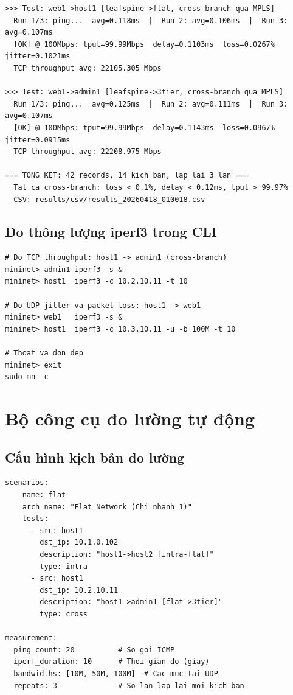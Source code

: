 \begin{lstlisting}[style=termstyle, caption={Ping cross-branch: web1 (Leaf-Spine) $\to$ host1 (Flat) và admin1 (3-Tier)}]
>>> Test: web1->host1 [leafspine->flat, cross-branch qua MPLS]
  Run 1/3: ping...  avg=0.118ms  |  Run 2: avg=0.106ms  |  Run 3: avg=0.107ms
  [OK] @ 100Mbps: tput=99.99Mbps  delay=0.1103ms  loss=0.0267% jitter=0.1021ms
  TCP throughput avg: 22105.305 Mbps

>>> Test: web1->admin1 [leafspine->3tier, cross-branch qua MPLS]
  Run 1/3: ping...  avg=0.125ms  |  Run 2: avg=0.111ms  |  Run 3: avg=0.107ms
  [OK] @ 100Mbps: tput=99.99Mbps  delay=0.1143ms  loss=0.0967% jitter=0.0915ms
  TCP throughput avg: 22208.975 Mbps

=== TONG KET: 42 records, 14 kich ban, lap lai 3 lan ===
  Tat ca cross-branch: loss < 0.1%, delay < 0.12ms, tput > 99.97%
  CSV: results/csv/results_20260418_010018.csv
\end{lstlisting}

\subsection{Đo thông lượng iperf3 trong CLI}

\begin{lstlisting}[style=bashstyle, caption={Đo thông lượng TCP và UDP bằng iperf3}]
# Do TCP throughput: host1 -> admin1 (cross-branch)
mininet> admin1 iperf3 -s &
mininet> host1  iperf3 -c 10.2.10.11 -t 10

# Do UDP jitter va packet loss: host1 -> web1
mininet> web1   iperf3 -s &
mininet> host1  iperf3 -c 10.3.10.11 -u -b 100M -t 10

# Thoat va don dep
mininet> exit
sudo mn -c
\end{lstlisting}


\section{Bộ công cụ đo lường tự động}

\subsection{Cấu hình kịch bản đo lường}

\begin{lstlisting}[style=pythonstyle, caption={Cấu hình kịch bản đo lường trong tests.yaml}]
scenarios:
  - name: flat
    arch_name: "Flat Network (Chi nhanh 1)"
    tests:
      - src: host1
        dst_ip: 10.1.0.102
        description: "host1->host2 [intra-flat]"
        type: intra
      - src: host1
        dst_ip: 10.2.10.11
        description: "host1->admin1 [flat->3tier]"
        type: cross

measurement:
  ping_count: 20          # So goi ICMP
  iperf_duration: 10      # Thoi gian do (giay)
  bandwidths: [10M, 50M, 100M]  # Cac muc tai UDP
  repeats: 3              # So lan lap lai moi kich ban
\end{lstlisting}

